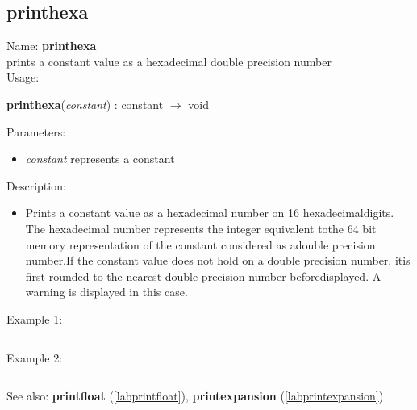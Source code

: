 \subsection{printhexa}
\label{labprinthexa}
\noindent Name: \textbf{printhexa}\\
prints a constant value as a hexadecimal double precision number\\
\noindent Usage: 
\begin{center}
\textbf{printhexa}(\emph{constant}) : \textsf{constant} $\rightarrow$ \textsf{void}\\
\end{center}
Parameters: 
\begin{itemize}
\item \emph{constant} represents a constant
\end{itemize}
\noindent Description: \begin{itemize}

\item Prints a constant value as a hexadecimal number on 16 hexadecimal\n   digits. The hexadecimal number represents the integer equivalent to\n   the 64 bit memory representation of the constant considered as a\n   double precision number.\n    \n   If the constant value does not hold on a double precision number, it\n   is first rounded to the nearest double precision number before\n   displayed. A warning is displayed in this case.\n\end{itemize}
\noindent Example 1: 
\begin{center}\begin{minipage}{15cm}\begin{Verbatim}[frame=single]
\end{Verbatim}
\end{minipage}\end{center}
\noindent Example 2: 
\begin{center}\begin{minipage}{15cm}\begin{Verbatim}[frame=single]
\end{Verbatim}
\end{minipage}\end{center}
See also: \textbf{printfloat} (\ref{labprintfloat}), \textbf{printexpansion} (\ref{labprintexpansion})
